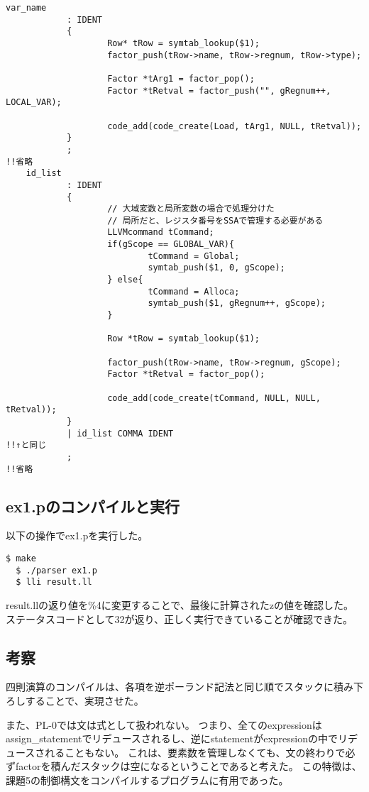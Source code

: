 \begin{lstlisting}[caption={parser.y},label={parser.y}]
    var_name
            : IDENT
            {
                    Row* tRow = symtab_lookup($1);
                    factor_push(tRow->name, tRow->regnum, tRow->type);
    
                    Factor *tArg1 = factor_pop();
                    Factor *tRetval = factor_push("", gRegnum++, LOCAL_VAR);
    
                    code_add(code_create(Load, tArg1, NULL, tRetval));
            }
            ;
!!省略
    id_list
            : IDENT
            {
                    // 大域変数と局所変数の場合で処理分けた
                    // 局所だと、レジスタ番号をSSAで管理する必要がある
                    LLVMcommand tCommand;
                    if(gScope == GLOBAL_VAR){
                            tCommand = Global;
                            symtab_push($1, 0, gScope);
                    } else{
                            tCommand = Alloca;
                            symtab_push($1, gRegnum++, gScope);
                    }
    
                    Row *tRow = symtab_lookup($1);
    
                    factor_push(tRow->name, tRow->regnum, gScope);
                    Factor *tRetval = factor_pop();
    
                    code_add(code_create(tCommand, NULL, NULL, tRetval));
            }
            | id_list COMMA IDENT
!!↑と同じ
            ;
!!省略
\end{lstlisting}

\subsection{ex1.pのコンパイルと実行}
以下の操作でex1.pを実行した。
\begin{lstlisting}[caption={ex.pの実行},label={ex.pの実行}]
  $ make
  $ ./parser ex1.p
  $ lli result.ll
\end{lstlisting}

result.llの返り値を\%4に変更することで、最後に計算されたzの値を確認した。
ステータスコードとして32が返り、正しく実行できていることが確認できた。

\subsection{考察}
四則演算のコンパイルは、各項を逆ポーランド記法と同じ順でスタックに積み下ろしすることで、実現させた。

また、PL-0では文は式として扱われない。
つまり、全てのexpressionはassign\_statementでリデュースされるし、逆にstatementがexpressionの中でリデュースされることもない。
これは、要素数を管理しなくても、文の終わりで必ずfactorを積んだスタックは空になるということであると考えた。
この特徴は、課題5の制御構文をコンパイルするプログラムに有用であった。\\

